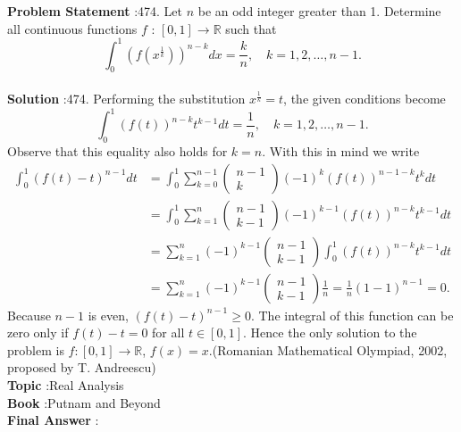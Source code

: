 \documentclass[10pt]{article}
\begin{document}
\textbf{Problem Statement} :474. Let $n$ be an odd integer greater than 1. Determine all continuous functions $f$ : $[0,1] \rightarrow \mathbb{R}$ such that$$ \int_{0}^{1}\left(f\left(x^{\frac{1}{k}}\right)\right)^{n-k} d x=\frac{k}{n}, \quad k=1,2, \ldots, n-1 . $$\\
\textbf{Solution} :474. Performing the substitution $x^{\frac{1}{k}}=t$, the given conditions become$$ \int_{0}^{1}(f(t))^{n-k} t^{k-1} d t=\frac{1}{n}, \quad k=1,2, \ldots, n-1 . $$Observe that this equality also holds for $k=n$. With this in mind we write$$ \begin{aligned} \int_{0}^{1}(f(t)-t)^{n-1} d t &=\int_{0}^{1} \sum_{k=0}^{n-1}\left(\begin{array}{c} n-1 \\ k \end{array}\right)(-1)^{k}(f(t))^{n-1-k} t^{k} d t \\ &=\int_{0}^{1} \sum_{k=1}^{n}\left(\begin{array}{c} n-1 \\ k-1 \end{array}\right)(-1)^{k-1}(f(t))^{n-k} t^{k-1} d t \\ &=\sum_{k=1}^{n}(-1)^{k-1}\left(\begin{array}{c} n-1 \\ k-1 \end{array}\right) \int_{0}^{1}(f(t))^{n-k} t^{k-1} d t \\ &=\sum_{k=1}^{n}(-1)^{k-1}\left(\begin{array}{c} n-1 \\ k-1 \end{array}\right) \frac{1}{n}=\frac{1}{n}(1-1)^{n-1}=0 . \end{aligned} $$Because $n-1$ is even, $(f(t)-t)^{n-1} \geq 0$. The integral of this function can be zero only if $f(t)-t=0$ for all $t \in[0,1]$. Hence the only solution to the problem is $f:[0,1] \rightarrow \mathbb{R}$, $f(x)=x$.(Romanian Mathematical Olympiad, 2002, proposed by T. Andreescu)\\
\textbf{Topic} :Real Analysis\\
\textbf{Book} :Putnam and Beyond\\
\textbf{Final Answer} :\\
\end{document}
